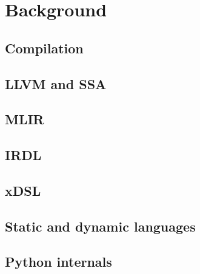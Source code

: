 \chapter{Background}
\label{chap:background}

%

\section{Compilation}
\label{sec:compilation}

\section{LLVM and SSA}
\label{sec:llvm-ssa}

\section{MLIR}
\label{sec:mlir}

\section{IRDL}
\label{sec:irdl}

\section{xDSL}
\label{sec:xdsl}

\section{Static and dynamic languages}
\label{sec:static-dynamic-languages}

\section{Python internals}
\label{sec:python-internals}

